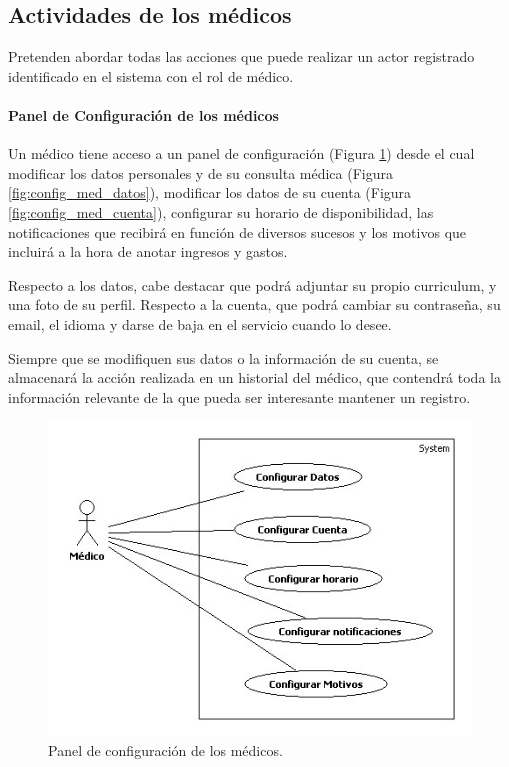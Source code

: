\documentclass[a4paper,oneside,11pt]{book}
\begin{document}
	
	
		\subsection{Actividades de los médicos} %
		\label{sec:actividades_de_los_medicos}
		
			Pretenden abordar todas las acciones que puede realizar un actor registrado identificado en el sistema con el rol de médico.
			\paragraph{Panel de Configuración de los médicos} %
			\label{par:panel_de_configuracion_de_los_medicos}
				Un médico tiene acceso a un panel de configuración (Figura \ref{fig:config_med}) desde el cual modificar los datos personales y de su consulta médica (Figura \ref{fig:config_med_datos}), modificar los datos de su cuenta (Figura \ref{fig:config_med_cuenta}), configurar su horario de disponibilidad, las notificaciones que recibirá en función de diversos sucesos y los motivos que incluirá a la hora de anotar ingresos y gastos.
				
				Respecto a los datos, cabe destacar que podrá adjuntar su propio curriculum, y una foto de su perfil. Respecto a la cuenta, que podrá cambiar su contraseña, su email, el idioma y darse de baja en el servicio cuando lo desee.
				
				Siempre que se modifiquen sus datos o la información de su cuenta, se almacenará la acción realizada en un historial del médico, que contendrá toda la información relevante de la que pueda ser interesante mantener un registro.
				\begin{figure}[H]
				  \centering
				    \includegraphics[width=12cm]{img/jpg/casos_uso/Configuracion_Medico.jpg}
				  \caption{Panel de configuración de los médicos.}
				  \label{fig:config_med}
				\end{figure}
				
\end{document}
